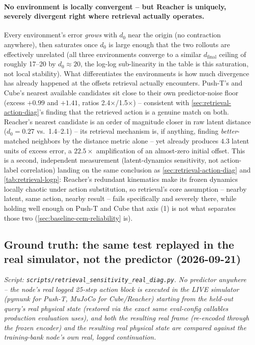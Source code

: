 \documentclass[11pt]{article}
\begin{document}
\paragraph{No environment is locally convergent -- but Reacher is uniquely, severely
divergent right where retrieval actually operates.} Every environment's error \emph{grows}
with $d_0$ near the origin (no contraction anywhere), then saturates once $d_0$ is large
enough that the two rollouts are effectively unrelated (all three environments converge to a
similar $d_{\text{final}}$ ceiling of roughly 17--20 by $d_0\approx20$, the log-log sub-linearity
in the table is this saturation, not local stability). What differentiates the environments is
how much divergence has already happened at the offsets retrieval actually encounters. Push-T's
and Cube's nearest available candidates sit close to their own predictor-noise floor (excess
$+0.99$ and $+1.41$, ratios 2.4$\times$/1.5$\times$) -- consistent with \cref{sec:retrieval-action-diag}'s
finding that the retrieved action is a genuine match on both. Reacher's nearest candidate is an
order of magnitude closer in raw latent distance ($d_0=0.27$ vs.\ 1.4--2.1) -- its retrieval
mechanism is, if anything, finding \emph{better}-matched neighbors by the distance metric alone
-- yet already produces $4.3$ latent units of excess error, a $22.5\times$ amplification of an
almost-zero initial offset. This is a second, independent measurement (latent-dynamics
sensitivity, not action-label correlation) landing on the same conclusion as
\cref{sec:retrieval-action-diag} and \cref{tab:retrieval-logp}: Reacher's redundant kinematics
make its frozen dynamics locally chaotic under action substitution, so retrieval's core
assumption -- nearby latent, same action, nearby result -- fails specifically and severely
there, while holding well enough on Push-T and Cube that axis (1) is not what separates those
two (\cref{sec:baseline-cem-reliability} is).

\subsection{Ground truth: the same test replayed in the real simulator, not the predictor
(2026-09-21)}
\label{sec:retrieval-dynamics-sensitivity-real}
\emph{Script: \texttt{scripts/retrieval\_sensitivity\_real\_diag.py}. No predictor anywhere --
the node's real logged 25-step action block is executed in the LIVE simulator (pymunk for
Push-T, MuJoCo for Cube/Reacher) starting from the held-out query's real physical state
(restored via the exact same eval-config callables production evaluation uses), and both the
resulting real frame (re-encoded through the frozen encoder) and the resulting real physical
state are compared against the training-bank node's own real, logged continuation.}
\end{document}
